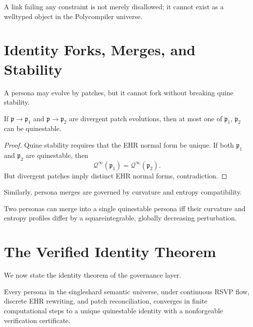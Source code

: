 A link failing any constraint is not merely disallowed;
it cannot exist as a well\textendash typed object in the Polycompiler universe.

\section{Identity Forks, Merges, and Stability}

A persona may evolve by patches, but it cannot fork without breaking quine stability.

\begin{proposition}
If $\mathfrak{p} \to \mathfrak{p}_1$ and $\mathfrak{p} \to \mathfrak{p}_2$
are divergent patch evolutions,
then at most one of $\mathfrak{p}_1$, $\mathfrak{p}_2$
can be quine\textendash stable.
\end{proposition}

\begin{proof}
Quine stability requires that the EHR normal form be unique.
If both $\mathfrak{p}_1$ and $\mathfrak{p}_2$ are quine\textendash stable,
then
\[
\mathcal{Q}^\infty(\mathfrak{p}_1)
 = \mathcal{Q}^\infty(\mathfrak{p}_2).
\]
But divergent patches imply distinct EHR normal forms,
contradiction.
\end{proof}

Similarly, persona merges are governed by curvature and entropy compatibility.

\begin{proposition}
Two personas can merge into a single quine\textendash stable persona
iff their curvature and entropy profiles differ by a
square\textendash integrable, globally decreasing perturbation.
\end{proposition}

\section{The Verified Identity Theorem}

We now state the identity theorem of the governance layer.

\begin{theorem}
Every persona in the single\textendash shard semantic universe,
under continuous RSVP flow, discrete EHR rewriting,
and patch reconciliation, converges in finite computational steps to a
unique quine\textendash stable identity with a non\textendash forgeable verification certificate.
\end{theorem}

